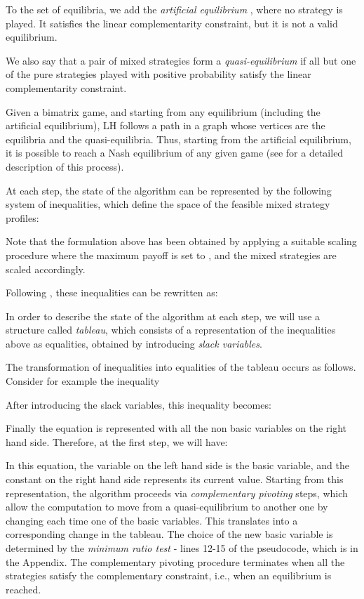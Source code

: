 \documentclass[11pt]{article}
\begin{document}
To the set of equilibria, we add the {\em artificial equilibrium}
, where no strategy is played. It satisfies the linear
complementarity constraint, but it is not a valid equilibrium.


We also say that a pair of mixed strategies form a {\em
quasi-equilibrium} if all but one of the pure strategies played with
positive probability satisfy the linear complementarity constraint.

Given a bimatrix game, and starting from any equilibrium (including
the artificial equilibrium), LH follows a path in a graph whose
vertices are the equilibria and the quasi-equilibria. Thus, starting
from the artificial equilibrium, it is possible to reach a Nash
equilibrium of any given game (see \cite{vstengel} for a detailed
description of this process).

At each step, the state of the algorithm can be represented by the
following system of inequalities, which define the space of the
feasible mixed strategy profiles:



Note that the formulation above has been obtained by applying a
suitable scaling procedure where the maximum payoff is set to ,
and the mixed strategies are scaled accordingly.

Following \cite{vstengel}, these inequalities can be rewritten as:





In order to describe the state of the algorithm at each step, we
will use a structure called {\em tableau}, which consists of a
representation of the inequalities above as equalities, obtained by
introducing {\em slack variables}.

The transformation of inequalities into equalities of the tableau
occurs as follows. Consider for example the inequality


After introducing the slack variables, this inequality becomes:


Finally the equation is represented with all the non basic variables
on the right hand side. Therefore, at the first step, we will have:


In this equation, the variable on the left hand side is the basic
variable, and the constant on the right hand side represents its
current value. Starting from this representation, the algorithm
proceeds via {\em complementary pivoting} steps, which allow the
computation to move from a quasi-equilibrium to another one by
changing each time one of the basic variables. This translates into
a corresponding change in the tableau. The choice of the new basic
variable is determined by the {\em minimum ratio test} - lines
12-15 of the pseudocode, which is in the Appendix.
The complementary pivoting procedure terminates
when all the strategies satisfy the complementary constraint, i.e.,
when an equilibrium is reached.
\end{document}
